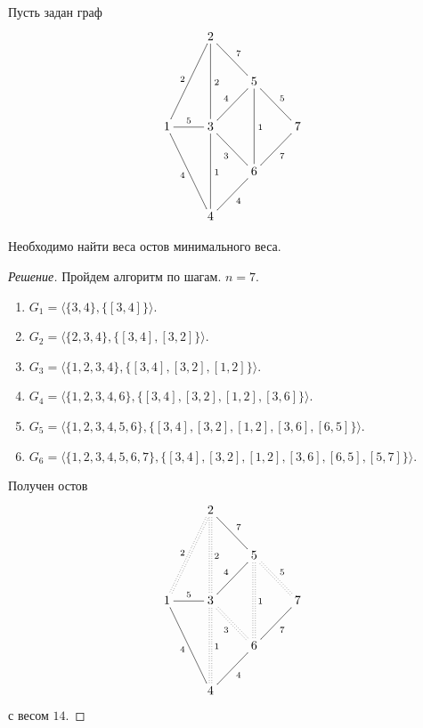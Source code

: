 \begin{exampl}
    Пусть задан граф 
    \[    
        {\xymatrix{
            *{}
                &{2} \ar@{-}[dd]^2 \ar@{-}[dr]^7
                    &*{}
                        &*{}
                            \\
            *{}
                &*{}
                    &{5} \ar@{-}[dr]^5 \ar@{-}[dd]^1
                        &*{}
                            \\
            {1} \ar@{-}[uur]^2 \ar@{-}[ddr]_4 \ar@{-}[r]^5
                &{3} \ar@{-}[dd]^1 \ar@{-}[ur]^4  \ar@{-}[dr]_3
                    &*{}
                        &{7}
                            \\
            *{}
                &*{}
                    &{6} \ar@{-}[ur]_7
                        &*{}
                            \\
            *{}
                &{4} \ar@{-}[ur]_4
                    &*{}
                        &*{}
        }}
    \]    
    
    Необходимо найти веса остов минимального веса.
\end{exampl}
\begin{proof}[Решение]
    Пройдем алгоритм по шагам. $n=7$.
    \begin{enumerate}
        \item $G_1=\langle\{3,4\},\{[3,4]\}\rangle$.
        \item $G_2=\langle\{2,3,4\},\{[3,4],[3,2]\}\rangle$.
        \item $G_3=\langle\{1,2,3,4\},\{[3,4],[3,2],[1,2]\}\rangle$.
        \item $G_4=\langle\{1,2,3,4,6\},\{[3,4],[3,2],[1,2],[3,6]\}\rangle$.
        \item $G_5=\langle\{1,2,3,4,5,6\},\{[3,4],[3,2],[1,2],[3,6],[6,5]\}\rangle$.
        \item $G_6=\langle\{1,2,3,4,5,6,7\},\{[3,4],[3,2],[1,2],[3,6],[6,5],[5,7]\}\rangle$.
    \end{enumerate}
    Получен остов
    \[    
        {\xymatrix{
            *{}
                &{2} \ar@{:}[dd]^2 \ar@{-}[dr]^7
                    &*{}
                        &*{}
                            \\
            *{}
                &*{}
                    &{5} \ar@{:}[dr]^5 \ar@{:}[dd]^1
                        &*{}
                            \\
            {1} \ar@{:}[uur]^2 \ar@{-}[ddr]_4 \ar@{-}[r]^5
                &{3} \ar@{:}[dd]^1 \ar@{-}[ur]^4  \ar@{:}[dr]_3
                    &*{}
                        &{7}
                            \\
            *{}
                &*{}
                    &{6} \ar@{-}[ur]_7
                        &*{}
                            \\
            *{}
                &{4} \ar@{-}[ur]_4
                    &*{}
                        &*{}
        }}
    \]    
    с весом $14$.
\end{proof}


